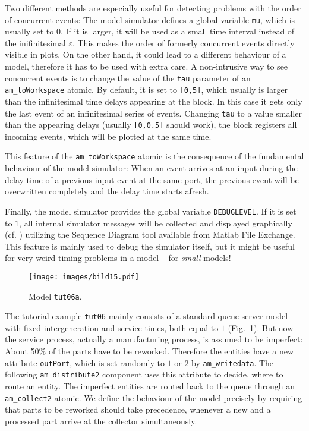 \documentclass[12pt,oneside,a4paper,bibtotoc,BCOR=0pt,DIV=20]{scrreprt}
\newcommand{\cft}[1]{\mbox{\texttt{#1}}}   %
\newcommand{\epsi}{\varepsilon}
\begin{document}
Two different methods are especially useful for detecting problems with the
order of concurrent events: The model simulator defines a global variable
\cft{mu}, which is usually set to $0$. If it is larger, it will be used as a
small time interval instead of the inifinitesimal $\epsi$. This makes the order
of formerly concurrent events directly visible in plots. On the other hand, it
could lead to a different behaviour of a model, therefore it has to be used
with extra care. A non-intrusive way to see concurrent events is to change the
value of the \cft{tau} parameter of an \cft{am\_toWorkspace} atomic. By
default, it is set to \cft{[0,5]}, which usually is larger than the
infinitesimal time delays appearing at the block. In this case it gets only the
last event of an infinitesimal series of events. Changing \cft{tau} to a value
smaller than the appearing delays (usually \cft{[0,0.5]} should work), the
block registers all incoming events, which will be plotted at the same time.

This feature of the \cft{am\_toWorkspace} atomic is the consequence of the
fundamental behaviour of the model simulator: When an event arrives at an input
during the delay time of a previous input event at the same port, the previous
event will be overwritten completely and the delay time starts afresh. 
  
Finally, the model simulator provides the global variable \cft{DEBUGLEVEL}. If
it is set to $1$, all internal simulator messages will be collected and
displayed graphically (cf. \cite{nsaSimulator2}) utilizing the Sequence Diagram
tool available from Matlab File Exchange. This feature is mainly used to debug
the simulator itself, but it might be useful for very weird timing problems in
a model -- for \emph{small} models! \\

\begin{figure}[ht]
\centering
\texttt{[image: images/bild15.pdf]}
\caption{Model \cft{tut06a}.}
\label{fig_15}
\end{figure}

The tutorial example \cft{tut06} mainly consists of a standard queue-server
model with fixed intergeneration and service times, both equal to $1$
(Fig.\ \ref{fig_15}). But now the service process, actually a manufacturing
process, is assumed to be imperfect: About 50\% of the parts have to be
reworked. Therefore the entities have a new attribute \cft{outPort}, which is
set randomly to $1$ or $2$ by \cft{am\_writedata}. The following
\cft{am\_distribute2} component uses this attribute to decide, where to route
an entity. The imperfect entities are routed back to the queue through an
\cft{am\_collect2} atomic. We define the behaviour of the model precisely by
requiring that parts to be reworked should take precedence, whenever a new and
a processed part arrive at the collector simultaneously.
\end{document}

